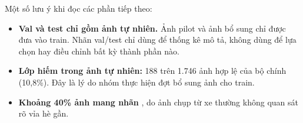 Một số lưu ý khi đọc các phần tiếp theo:
\begin{itemize}
  \item \textbf{Val và test chỉ gồm ảnh tự nhiên.} Ảnh pilot và ảnh bổ sung chỉ được đưa vào train. Nhãn val/test chỉ dùng để thống kê mô tả, không dùng để lựa chọn hay điều chỉnh bất kỳ thành phần nào.
  \item \textbf{Lớp  hiếm trong ảnh tự nhiên:} 188 trên 1.746 ảnh hợp lệ của bộ chính (10,8\%). Đây là lý do nhóm thực hiện đợt bổ sung ảnh cho train.
  \item \textbf{Khoảng 40\% ảnh mang nhãn }, do ảnh chụp từ xe thường không quan sát rõ vỉa hè gần.
\end{itemize}
